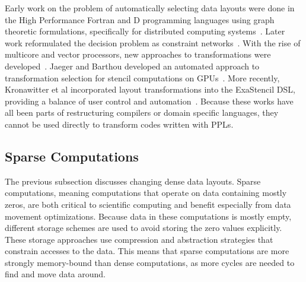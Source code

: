 Early work on the problem of automatically selecting data layouts were done in the High Performance Fortran and D programming languages using graph theoretic formulations, specifically for distributed computing systems~\cite{kennedy1995automatic,kennedy1998automatic}.
Later work reformulated the decision problem as constraint networks~\cite{chen2005constraint}.
With the rise of multicore and vector processors, new approaches to transformations were developed~\cite{lu2009data,henretty2011data,zhang2011optimizing}.
Jaeger and Barthou developed an automated approach to transformation selection for stencil computations on GPUs~\cite{jaeger2012automatic}.
More recently, Kronawitter et al incorporated layout transformations into the ExaStencil DSL, providing a balance of user control and automation~\cite{kronawitter2018automatic}.
Because these works have all been parts of restructuring compilers or domain specific languages, they cannot be used directly to transform codes written with PPLs.

\subsection{Sparse Computations}

The previous subsection discusses changing dense data layouts.
Sparse computations, meaning computations that operate on data containing mostly zeros, are both critical to scientific computing and benefit especially from data movement optimizations.
Because data in these computations is mostly empty, different storage schemes are used to avoid storing the zero values explicitly. 
These storage approaches use compression and abstraction strategies that constrain accesses to the data.
This means that sparse computations are more strongly memory-bound than dense computations, as more cycles are needed to find and move data around.

